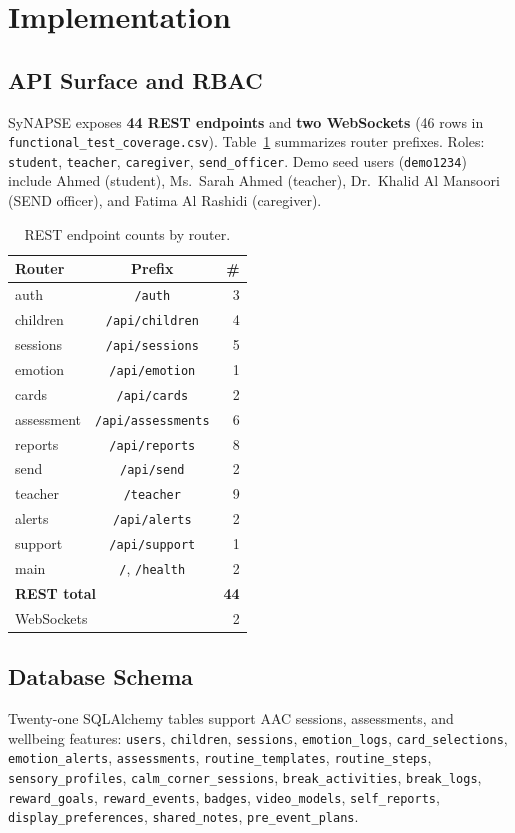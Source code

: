 \documentclass[conference]{IEEEtran}
\begin{document}
\section{Implementation}
\subsection{API Surface and RBAC}
SyNAPSE exposes \textbf{44 REST endpoints} and \textbf{two WebSockets} (46 rows in \texttt{functional\_test\_coverage.csv}). Table~\ref{tab:api} summarizes router prefixes. Roles: \texttt{student}, \texttt{teacher}, \texttt{caregiver}, \texttt{send\_officer}. Demo seed users (\texttt{demo1234}) include Ahmed (student), Ms.\ Sarah Ahmed (teacher), Dr.\ Khalid Al Mansoori (SEND officer), and Fatima Al Rashidi (caregiver).

\begin{table}[!t]
\centering
\caption{REST endpoint counts by router.}
\label{tab:api}
\small
\begin{tabular}{@{}lcr@{}}
\toprule
\textbf{Router} & \textbf{Prefix} & \textbf{\#} \\
\midrule
auth & \texttt{/auth} & 3 \\
children & \texttt{/api/children} & 4 \\
sessions & \texttt{/api/sessions} & 5 \\
emotion & \texttt{/api/emotion} & 1 \\
cards & \texttt{/api/cards} & 2 \\
assessment & \texttt{/api/assessments} & 6 \\
reports & \texttt{/api/reports} & 8 \\
send & \texttt{/api/send} & 2 \\
teacher & \texttt{/teacher} & 9 \\
alerts & \texttt{/api/alerts} & 2 \\
support & \texttt{/api/support} & 1 \\
main & \texttt{/}, \texttt{/health} & 2 \\
\midrule
\multicolumn{2}{l}{\textbf{REST total}} & \textbf{44} \\
\multicolumn{2}{l}{WebSockets} & 2 \\
\bottomrule
\end{tabular}
\end{table}

\subsection{Database Schema}
Twenty-one SQLAlchemy tables support AAC sessions, assessments, and wellbeing features: \texttt{users}, \texttt{children}, \texttt{sessions}, \texttt{emotion\_logs}, \texttt{card\_selections}, \texttt{emotion\_alerts}, \texttt{assessments}, \texttt{routine\_templates}, \texttt{routine\_steps}, \texttt{sensory\_profiles}, \texttt{calm\_corner\_sessions}, \texttt{break\_activities}, \texttt{break\_logs}, \texttt{reward\_goals}, \texttt{reward\_events}, \texttt{badges}, \texttt{video\_models}, \texttt{self\_reports}, \texttt{display\_preferences}, \texttt{shared\_notes}, \texttt{pre\_event\_plans}.
\end{document}
